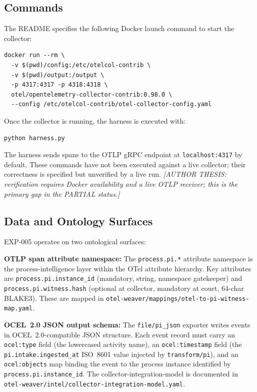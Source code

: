 \subsection{Commands}
\label{sec:otel-weaver-exp-005-collector-to-intake-implementation-commands}

The README specifies the following Docker launch command to start the collector:
\begin{verbatim}
docker run --rm \
  -v $(pwd)/config:/etc/otelcol-contrib \
  -v $(pwd)/output:/output \
  -p 4317:4317 -p 4318:4318 \
  otel/opentelemetry-collector-contrib:0.98.0 \
  --config /etc/otelcol-contrib/otel-collector-config.yaml
\end{verbatim}

Once the collector is running, the harness is executed with:
\begin{verbatim}
python harness.py
\end{verbatim}

The harness sends spans to the OTLP gRPC endpoint at \texttt{localhost:4317} by default.
These commands have not been executed against a live collector; their correctness is
specified but unverified by a live run. \textit{[AUTHOR THESIS: verification requires Docker
availability and a live OTLP receiver; this is the primary gap in the PARTIAL status.]}

\subsection{Data and Ontology Surfaces}
\label{sec:otel-weaver-exp-005-collector-to-intake-implementation-data}

EXP-005 operates on two ontological surfaces:

\textbf{OTLP span attribute namespace:} The \texttt{process.pi.*} attribute namespace is the
process-intelligence layer within the OTel attribute hierarchy. Key attributes are
\texttt{process.pi.instance\_id} (mandatory, string, namespace gatekeeper) and
\texttt{process.pi.witness.hash} (optional at collector, mandatory at court, 64-char BLAKE3).
These are mapped in \texttt{otel-weaver/mappings/otel-to-pi-witness-map.yaml}.

\textbf{OCEL~2.0 JSON output schema:} The \texttt{file/pi\_json} exporter writes events in
OCEL~2.0-compatible JSON structure. Each event record must carry an \texttt{ocel:type} field
(the lowercased activity name), an \texttt{ocel:timestamp} field (the
\texttt{pi.intake.ingested\_at} ISO~8601 value injected by \texttt{transform/pi}), and an
\texttt{ocel:objects} map binding the event to the process instance identified by
\texttt{process.pi.instance\_id}. The collector-integration-model is documented in
\texttt{otel-weaver/intel/collector-integration-model.yaml}.

